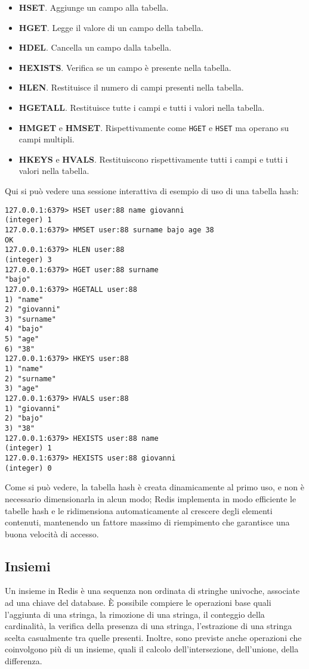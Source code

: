 \begin{itemize}
	\medskip
	\item \textbf{HSET}. Aggiunge un campo alla tabella.
	\item \textbf{HGET}. Legge il valore di un campo della tabella.
	\item \textbf{HDEL}. Cancella un campo dalla tabella.
	\item \textbf{HEXISTS}. Verifica se un campo è presente nella tabella.
	\item \textbf{HLEN}. Restituisce il numero di campi presenti nella tabella.
	\item \textbf{HGETALL}. Restituisce tutte i campi e tutti i valori nella tabella.
	\item \textbf{HMGET} e \textbf{HMSET}. Rispettivamente come \verb|HGET| e \verb|HSET| ma operano
	su campi multipli.
	\item \textbf{HKEYS} e \textbf{HVALS}. Restituiscono rispettivamente tutti i campi e tutti i
	valori nella tabella.
\end{itemize}

Qui si può vedere una sessione interattiva di esempio di uso di una tabella hash:

\medskip
\begin{lstlisting}
127.0.0.1:6379> HSET user:88 name giovanni
(integer) 1
127.0.0.1:6379> HMSET user:88 surname bajo age 38
OK
127.0.0.1:6379> HLEN user:88
(integer) 3
127.0.0.1:6379> HGET user:88 surname
"bajo"
127.0.0.1:6379> HGETALL user:88
1) "name"
2) "giovanni"
3) "surname"
4) "bajo"
5) "age"
6) "38"
127.0.0.1:6379> HKEYS user:88
1) "name"
2) "surname"
3) "age"
127.0.0.1:6379> HVALS user:88
1) "giovanni"
2) "bajo"
3) "38"
127.0.0.1:6379> HEXISTS user:88 name
(integer) 1
127.0.0.1:6379> HEXISTS user:88 giovanni
(integer) 0
\end{lstlisting}

Come si può vedere, la tabella hash è creata dinamicamente al primo uso, e non è necessario
dimensionarla in alcun modo; Redis implementa in modo efficiente le tabelle hash e le ridimensiona
automaticamente al crescere degli elementi contenuti, mantenendo un fattore massimo di riempimento
che garantisce una buona velocità di accesso.

\subsection{Insiemi}

Un insieme in Redis è una sequenza non ordinata di stringhe univoche, associate ad una chiave del
database. È possibile compiere le operazioni base quali l'aggiunta di una stringa, la rimozione di
una stringa, il conteggio della cardinalità, la verifica della presenza di una stringa, l'estrazione
di una stringa scelta casualmente tra quelle presenti. Inoltre, sono previste anche operazioni che
coinvolgono più di un insieme, quali il calcolo dell'intersezione, dell'unione, della differenza.

